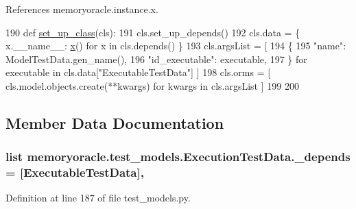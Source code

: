 References memoryoracle.\+instance.\+x.


\begin{DoxyCode}
190     \textcolor{keyword}{def }\hyperlink{classmemoryoracle_1_1test__models_1_1ExecutionTestData_aee8f3379c92809ba79acff8c1cac48c9}{set\_up\_class}(cls):
191         cls.set\_up\_depends()
192         cls.data = \{ x.\_\_name\_\_: \hyperlink{namespacememoryoracle_1_1instance_afe036cc8dc71469743d090c4c80d50c5}{x}() \textcolor{keywordflow}{for} x \textcolor{keywordflow}{in} cls.depends() \}
193         cls.argsList = [
194                 \{
195                     \textcolor{stringliteral}{"name"}: ModelTestData.gen\_name(),
196                     \textcolor{stringliteral}{"id\_executable"}: executable,
197                 \} \textcolor{keywordflow}{for} executable \textcolor{keywordflow}{in} cls.data[\textcolor{stringliteral}{"ExecutableTestData"}] ]
198         cls.orms = [ cls.model.objects.create(**kwargs) \textcolor{keywordflow}{for} kwargs \textcolor{keywordflow}{in} cls.argsList ]
199 
200 
\end{DoxyCode}


\subsection{Member Data Documentation}
\hypertarget{classmemoryoracle_1_1test__models_1_1ExecutionTestData_a2755e7fbb9b8274fd4572c36bb37e27c}{}
\subsubsection[{\+\_\+depends}]{\setlength{\rightskip}{0pt plus 5cm}list memoryoracle.\+test\+\_\+models.\+Execution\+Test\+Data.\+\_\+depends = \mbox{[}{\bf Executable\+Test\+Data}\mbox{]}\hspace{0.3cm}{\ttfamily [static]}, {\ttfamily [private]}}\label{classmemoryoracle_1_1test__models_1_1ExecutionTestData_a2755e7fbb9b8274fd4572c36bb37e27c}


Definition at line 187 of file test\+\_\+models.\+py.

\hypertarget{classmemoryoracle_1_1test__models_1_1ExecutionTestData_a6e5285d5b3b3ff2443ec195959d31213}{}
